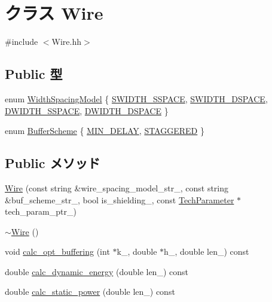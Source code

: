 \hypertarget{classWire}{
\section{クラス Wire}
\label{classWire}
}


{\ttfamily \#include $<$Wire.hh$>$}\subsection*{Public 型}
\begin{DoxyCompactItemize}
\item 
enum \hyperlink{classWire_afda9b782c9bf7887962c0498409f7a72}{WidthSpacingModel} \{ \hyperlink{classWire_afda9b782c9bf7887962c0498409f7a72a8486e9ef3c602465e7d194b87b188710}{SWIDTH\_\-SSPACE}, 
\hyperlink{classWire_afda9b782c9bf7887962c0498409f7a72a7ac346bbc9f151961ab6c40077ca7b44}{SWIDTH\_\-DSPACE}, 
\hyperlink{classWire_afda9b782c9bf7887962c0498409f7a72a0464274eec70a16fc96b5d712b0652e9}{DWIDTH\_\-SSPACE}, 
\hyperlink{classWire_afda9b782c9bf7887962c0498409f7a72a9673576b9fe4084981a4693677625576}{DWIDTH\_\-DSPACE}
 \}
\item 
enum \hyperlink{classWire_ac0e7fde4e26e813ba7a23f9b187087df}{BufferScheme} \{ \hyperlink{classWire_ac0e7fde4e26e813ba7a23f9b187087dfa39af23ffe8f3e05d31dbaf8bafe48764}{MIN\_\-DELAY}, 
\hyperlink{classWire_ac0e7fde4e26e813ba7a23f9b187087dfa449b606d0e015b88384844cd5cda69b5}{STAGGERED}
 \}
\end{DoxyCompactItemize}
\subsection*{Public メソッド}
\begin{DoxyCompactItemize}
\item 
\hyperlink{classWire_a719d9b3019b1898098a4d53bdd05c592}{Wire} (const string \&wire\_\-spacing\_\-model\_\-str\_\-, const string \&buf\_\-scheme\_\-str\_\-, bool is\_\-shielding\_\-, const \hyperlink{classTechParameter}{TechParameter} $\ast$tech\_\-param\_\-ptr\_\-)
\item 
\hyperlink{classWire_a6449e110e38a170ac1724b7543b160dc}{$\sim$Wire} ()
\item 
void \hyperlink{classWire_a9e250520c7c83648a5d8d82cdc14398f}{calc\_\-opt\_\-buffering} (int $\ast$k\_\-, double $\ast$h\_\-, double len\_\-) const 
\item 
double \hyperlink{classWire_a30d13fb156057eaa4ca8fa32166b5f6b}{calc\_\-dynamic\_\-energy} (double len\_\-) const 
\item 
double \hyperlink{classWire_a391cd6cda69a9f032580f7efe6ad0916}{calc\_\-static\_\-power} (double len\_\-) const 
\end{DoxyCompactItemize}
